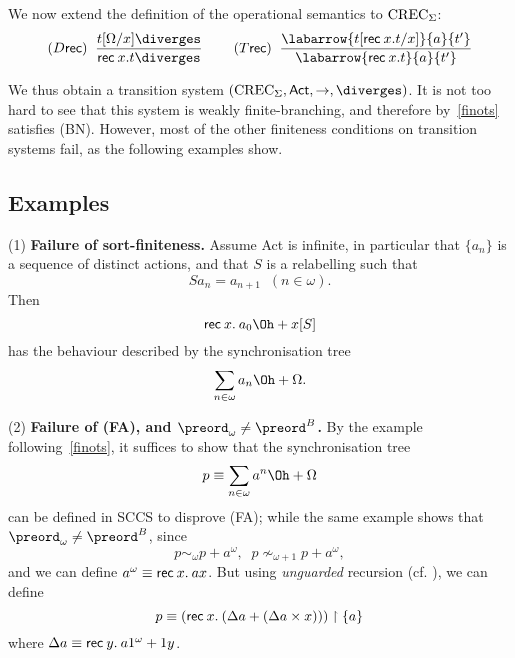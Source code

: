 We now extend the definition of the operational semantics to ${\rm CREC}_{\Sigma}$:
\[ (D{\sf rec}) \;\; \frac{t[{\Omega}/x] \diverges}{{\sf rec} \: x.t \diverges} 
\;\;\;\;\;\;\;\; (T {\sf rec}) \;\; \frac{\labarrow{t[{\sf rec} \: x.t/x]}{a}{t'}}{\labarrow{{\sf rec} \: x.t }{a}{t'}} \]

We thus obtain a transition system $({\rm CREC}_{\Sigma}, {\sf Act}, \rightarrow , \diverges )$.
It is not too hard to see that this system is weakly finite-branching, and therefore by~\ref{finots} satisfies (BN).
However, most of the other finiteness conditions on transition systems fail, as the following examples show.

\subsection*{Examples}
(1) {\bf Failure of sort-finiteness.} Assume {\sf Act} is infinite, in 
particular that $\{ a_{n} \}$ is a sequence of distinct actions, and that $S$ is a relabelling such that
\[ S a_{n} = a_{n + 1} \;\; (n \in \omega ). \]
Then
\[ {\sf rec} \: x. \: a_{0} \Oh + x[S] \]
has the behaviour described by the synchronisation tree
\[ {\sum_{n \in \omega} a_{n} \Oh } + \Omega . \]

\noindent (2) {\bf Failure of (FA), and ${\preord_{\omega}} \not= {\preord^{B}}$.} By the example following~\ref{finots}, it suffices to show that the synchronisation tree
\[ p \equiv {\sum_{n \in \omega} a^{n} \Oh } + \Omega \]
can be defined in SCCS to disprove (FA); while the same example shows that $\preord_{\omega} \not= \preord^{B}$, since
\[ p \sim_{\omega} p + a^{\omega}, \;\; p \nsim_{\omega + 1} p + a^{\omega} , \]
and we can define $a^{\omega} \equiv {\sf rec} \: x. \: ax$. 
But using {\em unguarded} recursion (cf. \cite{Mil83}), we can define
\[ p \equiv ({\sf rec} \: x. \: ( \Delta a + ( \Delta a \times x)))\restriction \{ a \} \]
where $\Delta a \equiv {\sf rec} \: y. \: a 1^{\omega} + 1 y$.

